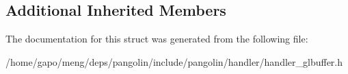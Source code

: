 \subsection*{Additional Inherited Members}


The documentation for this struct was generated from the following file\+:\begin{DoxyCompactItemize}
\item 
/home/gapo/meng/deps/pangolin/include/pangolin/handler/handler\+\_\+glbuffer.\+h\end{DoxyCompactItemize}
